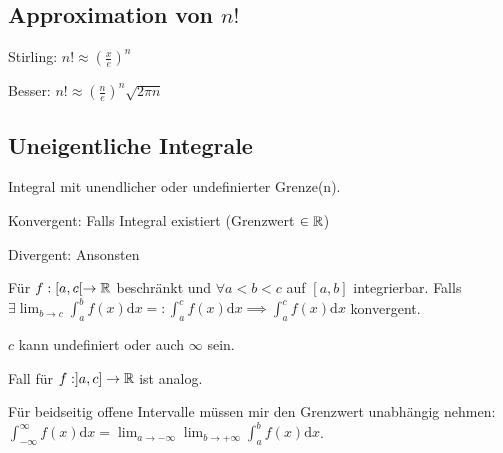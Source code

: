 \subsection{Approximation von $n!$}
\begin{compactdesc}
    \item[Stirling:] $n! \approx (\frac{x}{e})^n$
    \item[Besser:] $n! \approx (\frac{n}{e})^n \sqrt{2 \pi n}$
\end{compactdesc}

\subsection{Uneigentliche Integrale}
Integral mit unendlicher oder undefinierter Grenze(n).
\begin{compactdesc}
    \item[Konvergent:] Falls Integral existiert (Grenzwert $\in \mathbb{R}$)
    \item[Divergent:] Ansonsten
\end{compactdesc}

\begin{compactitem}
    \item Für $f: [a, c[ \to \mathbb{R}$ beschränkt und $\forall a < b < c$ auf $[a,b]$ integrierbar. Falls $\exists \lim_{b \to c} \int_{a}^{b} f(x) \mathrm{d}x =: \int_{a}^{c} f(x) \mathrm{d}x \implies \int_{a}^{c} f(x) \mathrm{d}x$ konvergent.
    \begin{compactitem}
        \item $c$ kann undefiniert oder auch $\infty$ sein.
        \item Fall für $f:]a, c] \to \mathbb{R}$ ist analog.
    \end{compactitem}
    \item Für beidseitig offene Intervalle müssen mir den Grenzwert unabhängig nehmen: $\int_{-\infty}^{\infty} f(x) \mathrm{d}x = \lim_{a \to -\infty} \lim_{b \to +\infty} \int_{a}^{b} f(x) \mathrm{d}x$.
\end{compactitem}

